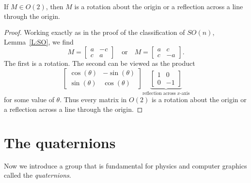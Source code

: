 \documentclass{ximera}
\begin{document}
\begin{theorem}
  If $M\in O(2)$, then $M$ is a rotation about the origin or a
  reflection across a line through the origin.
  \begin{proof}
    Working exactly as in the proof of the classification of $SO(n)$,
    Lemma~\ref{L:SO}, we find
    \[
    M = \begin{bmatrix}
      a & -c \\
      c & a
    \end{bmatrix} \quad\text{or}\quad
    M = \begin{bmatrix}
      a & c \\
      c & -a
    \end{bmatrix}.
    \]
    The first is a rotation. The second can be viewed as the product
    \[
    \begin{bmatrix}
      \cos(\theta) & -\sin(\theta) \\
      \sin(\theta) & \cos(\theta)
    \end{bmatrix}
    \underbrace{\begin{bmatrix}
      1 & 0 \\
      0 & -1
    \end{bmatrix}}_{\text{reflection across $x$-axis}}
    \]
    for some value of $\theta$. Thus every matrix in $O(2)$ is a
    rotation about the origin or a reflection across a line through
    the origin.
  \end{proof}
\end{theorem}


\section{The quaternions}

Now we introduce a group that is fundamental for physics and computer
graphics called the \textit{quaternions}.
\end{document}
